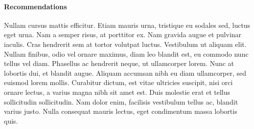 \paragraph{Recommendations}
Nullam cursus mattis efficitur. Etiam mauris urna, tristique eu sodales sed, luctus eget urna. Nam a semper risus, at porttitor ex. Nam gravida augue et pulvinar iaculis. Cras hendrerit sem at tortor volutpat luctus. Vestibulum ut aliquam elit. Nullam finibus, odio vel ornare maximus, diam leo blandit est, eu commodo nunc tellus vel diam. Phasellus ac hendrerit neque, ut ullamcorper lorem. Nunc at lobortis dui, et blandit augue. Aliquam accumsan nibh eu diam ullamcorper, sed euismod lorem mollis. Curabitur dictum, est vitae ultricies suscipit, nisi orci ornare lectus, a varius magna nibh sit amet est. Duis molestie erat et tellus sollicitudin sollicitudin. Nam dolor enim, facilisis vestibulum tellus ac, blandit varius justo. Nulla consequat mauris lectus, eget condimentum massa lobortis quis. 
